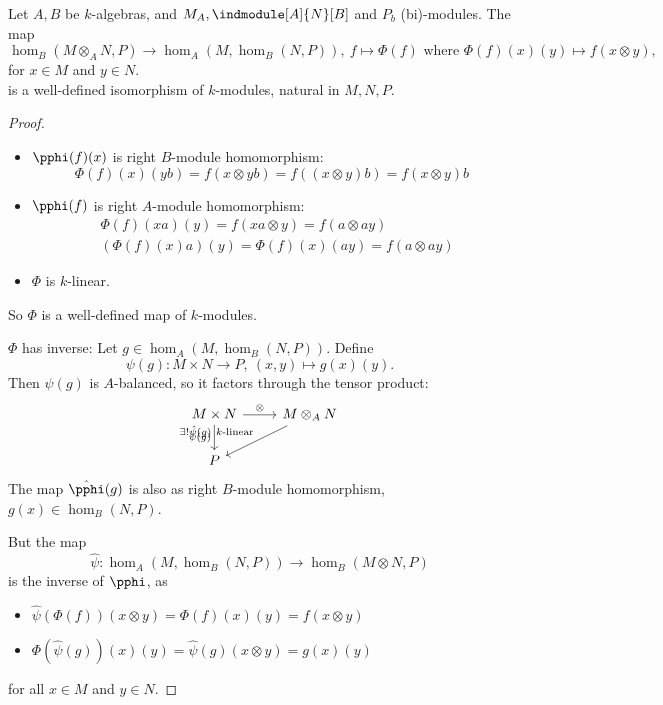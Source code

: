 \begin{prop}
  Let $A,B$ be $k$-algebras, and $M_A,\indmodule[A]{N}[B]$ and $P_b$ (bi)-modules. The map
  \[
  \hom_B(M\otimes_AN,P)\to \hom_A\left(M,\hom_B\left(N,P\right)\right),~f\mapsto \Phi(f)\text{ where }\Phi(f)(x)(y)\mapsto f(x\otimes y),
  \]
  for $x\in M$ and $y\in N$.\\
  is a well-defined isomorphism of $k$-modules, natural in $M,N,P$.
\end{prop}
\begin{proof}
  \begin{itemize}
    \item $\pphi(f)(x)$ is right $B$-module homomorphism:
    \[
      \Phi(f)(x)(yb)=f(x\otimes yb) = f((x\otimes y)b)=f(x\otimes y)b
    \]
    \item $\pphi(f)$ is right $A$-module homomorphism:
    \begin{align*}
      &\Phi(f)(xa)(y)=f(xa\otimes y) = f(a\otimes ay)\\
      &\left(\Phi(f)(x)a\right)(y) = \Phi(f)(x)(ay) =f(a\otimes ay)
    \end{align*}
    \item $\Phi$ is $k$-linear.
  \end{itemize}
  So $\Phi$ is a well-defined map of $k$-modules.\par
  $\Phi$ has inverse: Let $g\in \hom_A(M,\hom_B(N,P))$. Define
  \[
  \psi(g):M\times N\to P,~(x,y)\mapsto g(x)(y).
  \]
  Then $\psi(g)$ is $A$-balanced, so it factors through the tensor product:
  \[
  \begin{tikzcd}
    M\times N\ar{r}{\otimes}\ar[swap]{d}{\psi(g)}&M\otimes_AN\ar[swap]{dl}{\exists!\hat{\psi}(g)~k\text{-linear}}\\
    P&
  \end{tikzcd}
  \]
  The map $\hat{\pphi}(g)$ is also as right $B$-module homomorphism, \coms $g(x)\in \hom_B(N,P)$\come.\par
  But the map
  \[
  \hat{\psi}:\hom_A(M,\hom_B(N,P))\to \hom_B(M\otimes N,P)
  \]
  is the inverse of $\pphi$, as
  \begin{itemize}
    \item $\hat{\psi}(\Phi(f))(x\otimes y)=\Phi(f)(x)(y)=f(x\otimes y)$
    \item $\Phi(\hat{\psi}(g))(x)(y)=\hat{\psi}(g)(x\otimes y)=g(x)(y)$
  \end{itemize}
  for all $x\in M$ and $y\in N$.
\end{proof}

